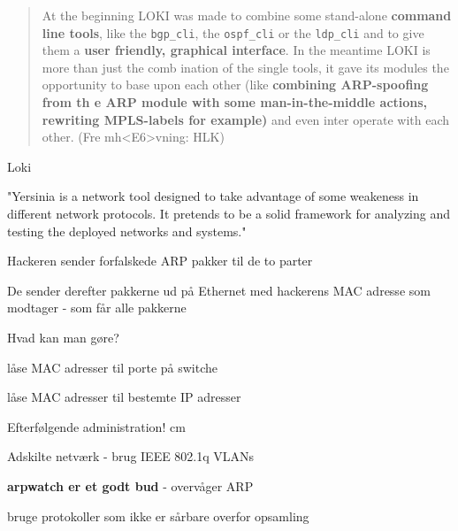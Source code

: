 \documentclass[Screen16to9,17pt]{foils}
\begin{document}

\begin{quote}
At the beginning LOKI was made to combine some stand-alone {\bf command line tools}, like the \verb+bgp_cli+, the \verb+ospf_cli+
or the \verb+ldp_cli+ and to give them a {\bf user friendly, graphical interface}. In the meantime LOKI is more than just the comb
ination of the single tools, it gave its modules the opportunity to base upon each other (like {\bf combining ARP-spoofing from th
e ARP module with some man-in-the-middle actions, rewriting MPLS-labels for example)} and even inter operate with each other. (Fre
mh<E6>vning: HLK)
\end{quote}

\begin{list1}
\item {} Loki
\item {}
\item "Yersinia is a network tool designed to take advantage of some weakeness in different network protocols. It pretends to be a solid framework for analyzing and testing the deployed networks and systems."  
\end{list1}






\begin{list1}
\item Hackeren sender forfalskede ARP pakker til de to parter
\item De sender derefter pakkerne ud på Ethernet med hackerens MAC
  adresse som modtager - som får alle pakkerne
\end{list1}


\begin{list1}
\item Hvad kan man gøre?
\item låse MAC adresser til porte på switche
\item låse MAC adresser til bestemte IP adresser
\item Efterfølgende administration!
 cm
\item Adskilte netværk - brug IEEE 802.1q VLANs
\item {\bfseries arpwatch er et godt bud} - overvåger ARP
\item bruge protokoller som ikke er sårbare overfor opsamling
\end{list1}
\end{document}
